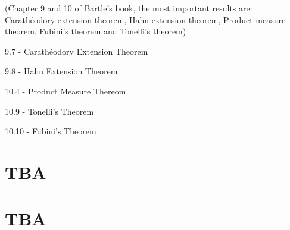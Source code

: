 \documentclass{article}
\begin{document}
(Chapter 9 and 10 of Bartle's book, the most important results are: Carathéodory extension theorem, Hahn extension theorem, Product measure theorem, Fubini's theorem and Tonelli's theorem)

9.7 - Carathéodory Extension Theorem

9.8 - Hahn Extension Theorem

10.4 - Product Measure Thereom

10.9 - Tonelli's Theorem

10.10 - Fubini's Theorem

\newpage

\section{TBA}

\newpage

\section{TBA}
\end{document}
